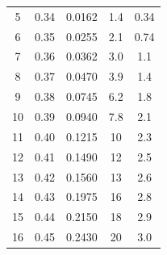 \begin{center}
\begin{table}[H]
\begin{tabular}{|c|c|c|c|c|}
5  & 0.34 & 0.0162 & 1.4 & 0.34\\
6  & 0.35 & 0.0255 & 2.1 & 0.74\\
7  & 0.36 & 0.0362 & 3.0 & 1.1\\
8  & 0.37 & 0.0470 & 3.9 & 1.4\\
9  & 0.38 & 0.0745 & 6.2 & 1.8\\
10 & 0.39 & 0.0940 & 7.8 & 2.1\\
11 & 0.40 & 0.1215 & 10 & 2.3\\
12 & 0.41 & 0.1490 & 12 & 2.5\\
13 & 0.42 & 0.1560 & 13 & 2.6\\
14 & 0.43 & 0.1975 & 16 & 2.8\\
15 & 0.44 & 0.2150 & 18 & 2.9\\
16 & 0.45 & 0.2430 & 20 & 3.0\\
\hline
\end{tabular}
\end{table}
\end{center}

